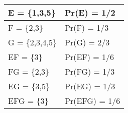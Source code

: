 \begin{tabular}{|l|l|}\hline
E = \{1,3,5\}	&Pr(E) = 1/2\\\hline
F = \{2,3\}	&Pr(F) = 1/3\\\hline
G = \{2,3,4,5\}	&Pr(G) = 2/3\\\hline
EF = \{3\}	&Pr(EF) = 1/6\\\hline
FG = \{2,3\}	&Pr(FG) = 1/3\\\hline
EG = \{3,5\}	&Pr(EG) = 1/3\\\hline
EFG = \{3\}	&Pr(EFG) = 1/6\\\hline
\end{tabular}
